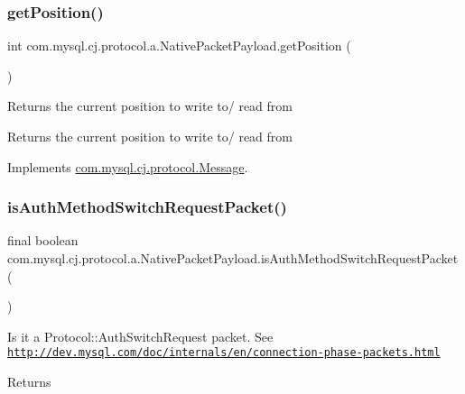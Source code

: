\subsubsection{\texorpdfstring{get\+Position()}{getPosition()}}
{\footnotesize\ttfamily int com.\+mysql.\+cj.\+protocol.\+a.\+Native\+Packet\+Payload.\+get\+Position (\begin{DoxyParamCaption}{ }\end{DoxyParamCaption})}

Returns the current position to write to/ read from

\begin{DoxyReturn}{Returns}
the current position to write to/ read from 
\end{DoxyReturn}


Implements \mbox{\hyperlink{interfacecom_1_1mysql_1_1cj_1_1protocol_1_1_message_a87a2626f6e5aceccffe224bcaf0e126b}{com.\+mysql.\+cj.\+protocol.\+Message}}.

\mbox{\label{classcom_1_1mysql_1_1cj_1_1protocol_1_1a_1_1_native_packet_payload_aa4a35c30b6d281a9aace69b8c2996432}} 
\subsubsection{\texorpdfstring{is\+Auth\+Method\+Switch\+Request\+Packet()}{isAuthMethodSwitchRequestPacket()}}
{\footnotesize\ttfamily final boolean com.\+mysql.\+cj.\+protocol.\+a.\+Native\+Packet\+Payload.\+is\+Auth\+Method\+Switch\+Request\+Packet (\begin{DoxyParamCaption}{ }\end{DoxyParamCaption})}

Is it a Protocol\+::\+Auth\+Switch\+Request packet. See \href{http://dev.mysql.com/doc/internals/en/connection-phase-packets.html}{\tt http\+://dev.\+mysql.\+com/doc/internals/en/connection-\/phase-\/packets.\+html}

\begin{DoxyReturn}{Returns}

\end{DoxyReturn}
\mbox{\label{classcom_1_1mysql_1_1cj_1_1protocol_1_1a_1_1_native_packet_payload_a54b7b6f463139cb3d33d84212db442d3}} 
